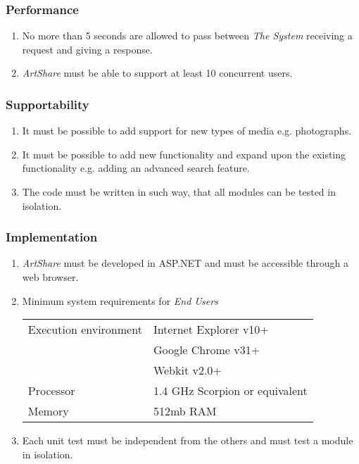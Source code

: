 \documentclass[../report.tex]{subfiles}
\begin{document}
\subsubsection{Performance}

\begin{enumerate}[label=\textbf{NFR-\twodigits*}, resume]
\item No more than 5 seconds are allowed to pass between \textit{The System} receiving a request and giving a response.
\item \textit{ArtShare} must be able to support at least 10 concurrent users. 
\end{enumerate}

\subsubsection{Supportability}

\begin{enumerate}[label=\textbf{NFR-\twodigits*}, resume]
\item It must be possible to add support for new types of media e.g. photographs.
\item It must be possible to add new functionality and expand upon the existing functionality e.g. adding an advanced search feature.
\item The code must be written in such way, that all modules can be tested in isolation.
\end{enumerate}

\subsubsection{Implementation}
\begin{enumerate}[label=\textbf{NFR-\twodigits*}, resume]
\item \textit{ArtShare} must be developed in ASP.NET and must be accessible through a web browser.
\item Minimum system requirements for \textit{End Users}


\begin{tabular}{| l | l | }
\hline
 Execution environment & Internet Explorer v10+\\
& Google Chrome v31+\\
& Webkit v2.0+\\ \hline
 Processor & 1.4 GHz Scorpion or equivalent \\ \hline
 Memory & 512mb RAM  \\ \hline

\end{tabular}

\item Each unit test must be independent from the others and must test a module in isolation.
\end{enumerate}


\end{document}
